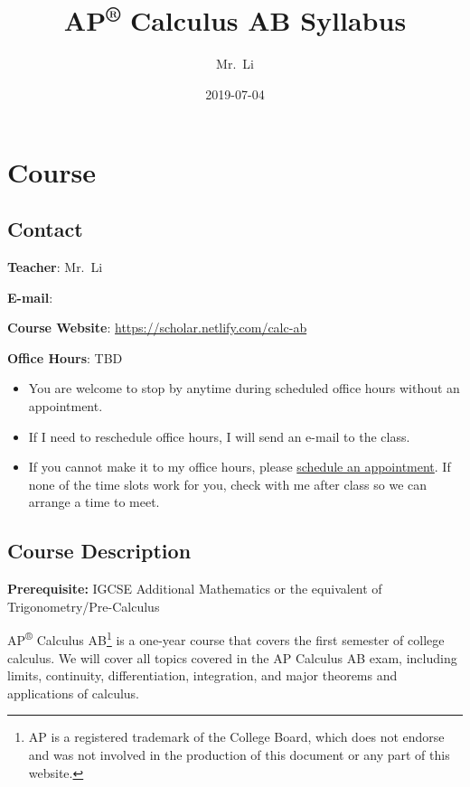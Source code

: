 \documentclass[12pt,fleqn]{article}
\title{AP\textsuperscript{®} Calculus AB Syllabus}
\author{Mr.~Li}
\date{2019-07-04}
\providecommand{\tightlist}{%
  \setlength{\itemsep}{0pt}\setlength{\parskip}{0pt}}
\let\rmarkdownfootnote\footnote%
\def\footnote{\protect\rmarkdownfootnote}
\begin{document}
\maketitle

{
\setcounter{tocdepth}{2}
\tableofcontents
}
\hypertarget{course}{%
\section{Course}\label{course}}

\hypertarget{contact}{%
\subsection{Contact}\label{contact}}

\textbf{Teacher}: Mr.~Li

\textbf{E-mail}:

\textbf{Course Website}: \url{https://scholar.netlify.com/calc-ab}

\textbf{Office Hours}: TBD

\begin{itemize}
\tightlist
\item
  You are welcome to stop by anytime during scheduled office hours without an appointment.
\item
  If I need to reschedule office hours, I will send an e-mail to the class.
\item
  If you cannot make it to my office hours, please \href{https://scholar.netlify.com/\#contact}{schedule an appointment}. If none of the time slots work for you, check with me after class so we can arrange a time to meet.
\end{itemize}

\hypertarget{course-description}{%
\subsection{Course Description}\label{course-description}}

\textbf{Prerequisite:} IGCSE Additional Mathematics or the equivalent of Trigonometry/Pre-Calculus

AP\textsuperscript{®} Calculus AB\footnote{AP is a registered trademark of the College Board, which does not endorse and was not involved in the production of this document or any part of this website.} is a one-year course that covers the first semester of college calculus. We will cover all topics covered in the AP Calculus AB exam, including limits, continuity, differentiation, integration, and major theorems and applications of calculus.
\end{document}
